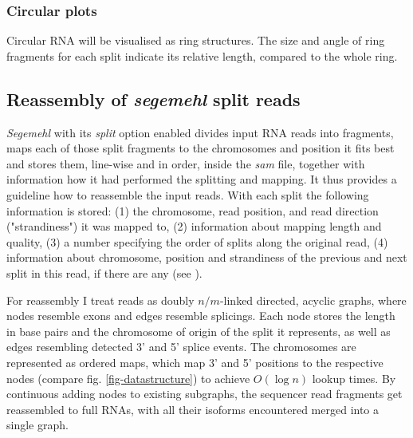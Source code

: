 \documentclass[11pt]{article}
\begin{document}
\subsubsection{Circular plots}
\label{sec-2-2-2}
\label{txt:circ1}

Circular RNA will be visualised as ring structures. The size and angle of ring fragments for each
split indicate its relative length, compared to the whole ring.


\subsection{Reassembly of \emph{segemehl} split reads}
\label{sec-2-3}
\label{txt:reassembly}

\emph{Segemehl} with its \emph{split} option enabled divides input RNA reads into fragments, maps each 
of those split fragments to the chromosomes and position it fits best and stores them, 
line-wise and in order, inside the \emph{sam} file, together with information how it had
performed the splitting and mapping.
It thus provides a guideline how to reassemble the input reads.
With each split the following information is stored: 
(1) the chromosome, read position, and read direction ("strandiness") it was mapped to,
(2) information about mapping length and quality,
(3) a number specifying the order of splits along the original read,
(4) information about chromosome, position and strandiness of the previous and next split in
this read, if there are any (see \cite{smmanual}).

For reassembly I treat reads as doubly $n/m$-linked directed, acyclic graphs, where nodes
resemble exons and edges resemble splicings.
Each node stores the length in base pairs and the chromosome of origin of the split it 
represents, as well as edges resembling detected 3' and 5' splice events.
The chromosomes are represented as ordered maps, which map 3' and 5' positions to the respective
nodes (compare fig. \ref{fig-datastructure}) to achieve $O(\log n)$ lookup times.
By continuous adding nodes to existing subgraphs, the sequencer read fragments get reassembled
to full RNAs, with all their isoforms encountered merged into a single graph.
\end{document}
